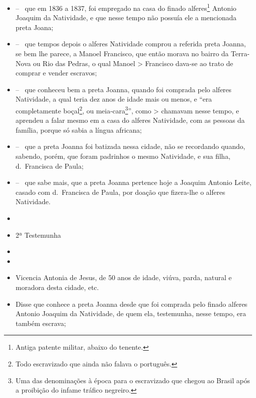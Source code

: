 \begin{itemize}
\item
  -- ~que em 1836 a 1837, foi empregado na casa do finado
  alferes\footnote{ Antiga patente militar, abaixo do tenente.} Antonio
  Joaquim da Natividade, e que nesse tempo não possuía ele a mencionada
  preta Joana;
\item
  -- ~que tempos depois o alferes Natividade comprou a referida preta
  Joanna, se bem lhe parece, a Manoel Francisco, que então morava no
  bairro da Terra-Nova ou Rio das Pedras, o qual Manoel \textgreater{}
  Francisco dava-se ao trato de comprar e vender escravos;
\item
  -- ~que conheceu bem a preta Joanna, quando foi comprada pelo alferes
  Natividade, a qual teria dez anos de idade mais ou menos, e ``era
  completamente boçal\footnote{ Todo escravizado que ainda não falava o
    português.}, ou meia-cara\footnote{ Uma das denominações à época
    para o escravizado que chegou ao Brasil após a proibição do infame
    tráfico negreiro.}'', como \textgreater{} chamavam nesse tempo, e
  aprendeu a falar mesmo em a casa do alferes Natividade, com as pessoas
  da família, porque só sabia a língua africana;
\item
  -- ~que a preta Joanna foi batizada nessa cidade, não se recordando
  quando, sabendo, porém, que foram padrinhos o mesmo Natividade, e sua
  filha, d.~Francisca de Paula;
\item
  -- ~que sabe mais, que a preta Joanna pertence hoje a Joaquim Antonio
  Leite, casado com d.~Francisca de Paula, por doação que fizera-lhe o
  alferes Natividade.
\item
\item
  2ª Testemunha
\item
\item
\item
  Vicencia Antonia de Jesus, de 50 anos de idade, viúva, parda, natural
  e moradora desta cidade, etc.
\item
  Disse que conhece a preta Joanna desde que foi comprada pelo finado
  alferes Antonio Joaquim da Natividade, de quem ela, testemunha, nesse
  tempo, era também escrava;
\end{itemize}

